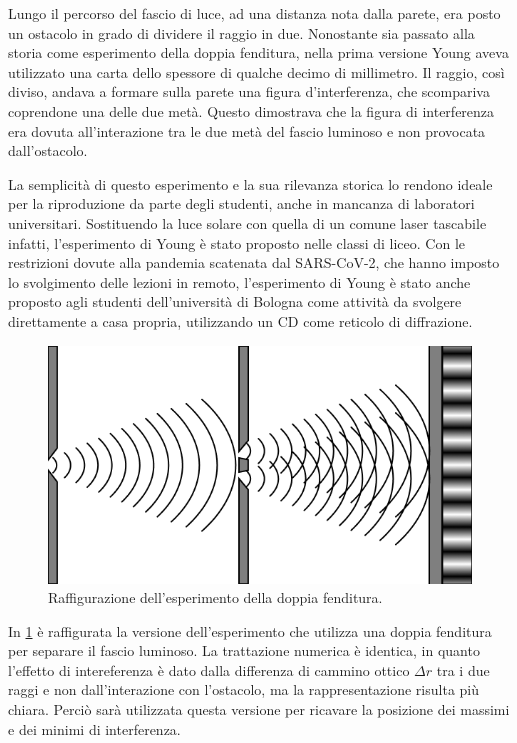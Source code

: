 \documentclass[12pt,a4paper]{report}
\begin{document}
Lungo il percorso del fascio di luce, ad una distanza nota dalla parete, era posto un ostacolo in grado di dividere il raggio in due. Nonostante sia passato alla storia come esperimento della doppia fenditura, nella prima versione Young aveva utilizzato una carta dello spessore di qualche decimo di millimetro. Il raggio, così diviso, andava a formare sulla parete una figura d'interferenza, che scompariva coprendone una delle due metà. Questo dimostrava che la figura di interferenza era dovuta all'interazione tra le due metà del fascio luminoso e non provocata dall'ostacolo.

La semplicità di questo esperimento e la sua rilevanza storica lo rendono ideale per la riproduzione da parte degli studenti, anche in mancanza di laboratori universitari. Sostituendo la luce solare con quella di un comune laser tascabile infatti, l'esperimento di Young è stato proposto nelle classi di liceo\cite{Scheider1986}. Con le restrizioni dovute alla pandemia scatenata dal SARS-CoV-2, che hanno imposto lo svolgimento delle lezioni in remoto, l'esperimento di Young è stato anche proposto agli studenti dell'università di Bologna come attività da svolgere direttamente a casa propria, utilizzando un CD come reticolo di diffrazione\cite{Campari2021}. 

\begin{figure}[!ht]
    \centering
    \includegraphics[width=\linewidth]{Immagini/double_slit_above.png}
    \captionsetup{width=.8\linewidth}
    \caption{Raffigurazione dell'esperimento della doppia fenditura.}
    \label{fig:doubleSlitAbove}
\end{figure}

In \cref{fig:doubleSlitAbove} è raffigurata la versione dell'esperimento che utilizza una doppia fenditura per separare il fascio luminoso. La trattazione numerica è identica, in quanto l'effetto di intereferenza è dato dalla differenza di cammino ottico \( \Delta r \) tra i due raggi e non dall'interazione con l'ostacolo, ma la rappresentazione risulta più chiara. Perciò sarà utilizzata questa versione per ricavare la posizione dei massimi e dei minimi di interferenza.
\end{document}
